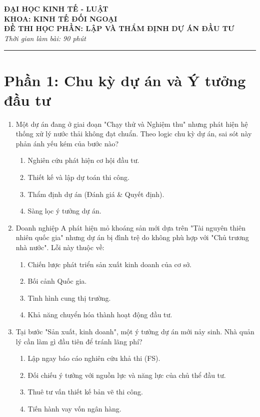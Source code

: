 
\begin{center}
    \textbf{ĐẠI HỌC KINH TẾ - LUẬT}\\
    \textbf{KHOA: KINH TẾ ĐỐI NGOẠI}\\
    \vspace{0.5cm}
    \large \textbf{ĐỀ THI HỌC PHẦN: LẬP VÀ THẨM ĐỊNH DỰ ÁN ĐẦU TƯ}\\
    \textit{Thời gian làm bài: 90 phút}
\end{center}

\rule{\textwidth}{1pt}

\section{Phần 1: Chu kỳ dự án và Ý tưởng đầu tư}

\begin{enumerate}[label=\textbf{Câu \arabic*:}, leftmargin=*]

\item Một dự án đang ở giai đoạn "Chạy thử và Nghiệm thu" nhưng phát hiện hệ thống xử lý nước thải không đạt chuẩn. Theo logic chu kỳ dự án, sai sót này phản ánh yếu kém của bước nào?
\begin{enumerate}[label=\Alph*.]
    \item Nghiên cứu phát hiện cơ hội đầu tư.
    \item Thiết kế và lập dự toán thi công.
    \item Thẩm định dự án (Đánh giá \& Quyết định).
    \item Sàng lọc ý tưởng dự án.
\end{enumerate}

\item Doanh nghiệp A phát hiện mỏ khoáng sản mới dựa trên "Tài nguyên thiên nhiên quốc gia" nhưng dự án bị đình trệ do không phù hợp với "Chủ trương nhà nước". Lỗi này thuộc về:
\begin{enumerate}[label=\Alph*.]
    \item Chiến lược phát triển sản xuất kinh doanh của cơ sở.
    \item Bối cảnh Quốc gia.
    \item Tình hình cung thị trường.
    \item Khả năng chuyển hóa thành hoạt động đầu tư.
\end{enumerate}

\item Tại bước "Sản xuất, kinh doanh", một ý tưởng dự án mới nảy sinh. Nhà quản lý cần làm gì đầu tiên để tránh lãng phí?
\begin{enumerate}[label=\Alph*.]
    \item Lập ngay báo cáo nghiên cứu khả thi (FS).
    \item Đối chiếu ý tưởng với nguồn lực và năng lực của chủ thể đầu tư.
    \item Thuê tư vấn thiết kế bản vẽ thi công.
    \item Tiến hành vay vốn ngân hàng.
\end{enumerate}


\end{enumerate}
